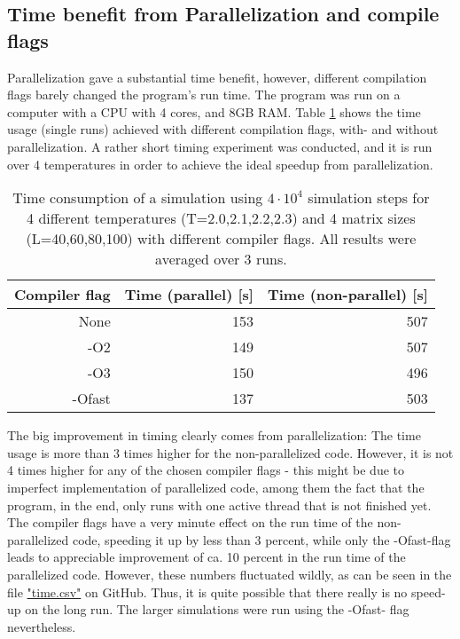 \documentclass[10pt,a4paper]{article}
\begin{document}
\subsection{Time benefit from Parallelization and compile flags}
Parallelization gave a substantial time benefit, however, different compilation flags barely changed the program's run time. The program was run on a computer with a CPU with 4 cores, and 8GB RAM. Table \ref{Runtime compiler flags} shows the time usage (single runs) achieved with different compilation flags, with- and without parallelization. A rather short timing experiment was conducted, and it is run over 4 temperatures in order to achieve the ideal speedup from parallelization.
\begin{table}[H]
\centering
\caption[Time usage parallel/non-parallel, compilation flags]{Time consumption of a simulation using $4\cdot10^4$ simulation steps for 4 different temperatures (T=2.0,2.1,2.2,2.3) and 4 matrix sizes (L=40,60,80,100) with different compiler flags. All results were averaged over 3 runs.}
\centering
\begin{tabular}{|r|r|r|}
\hline
Compiler flag & Time (parallel) [s] & Time (non-parallel) [s] \\ \hline
None             & 153                 & 507                     \\ \hline
-O2              & 149                 & 507                     \\ \hline
-O3              & 150                 & 496                     \\ \hline
-Ofast           & 137                 & 503                     \\ \hline
\end{tabular}\label{Runtime compiler flags}
\end{table}
The big improvement in timing clearly comes from parallelization: The time usage is more than 3 times higher for the non-parallelized code. However, it is not 4 times higher for any of the chosen compiler flags - this might be due to imperfect implementation of parallelized code, among them the fact that the program, in the end, only runs with one active thread that is not finished yet. The compiler flags have a very minute effect on the run time of the non-parallelized code, speeding it up by less than 3 percent, while only the -Ofast-flag leads to appreciable improvement of ca. 10 percent in the run time of the parallelized code. However, these numbers fluctuated wildly, as can be seen in the file \href{https://github.com/adrian2208/FYS3150_collab/blob/master/Project4/selected_results/time.csv}{"time.csv"} on GitHub. Thus, it is quite possible that there really is no speed-up on the long run. The larger simulations were run using the -Ofast- flag nevertheless.
\end{document}
